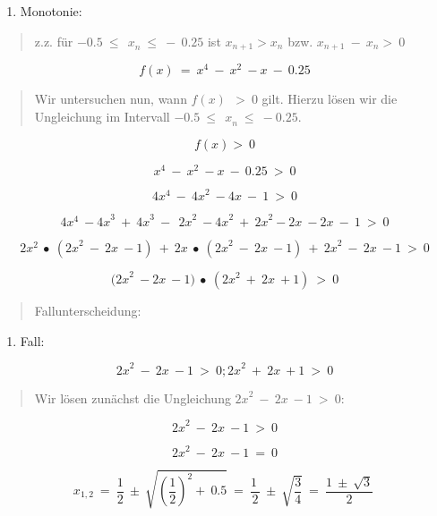 \documentclass[a4paper, 12pt]{book}
\begin{document}
\begin{longtable}[]
\begin{minipage}[b]{\linewidth}
\begin{enumerate}
\def\labelenumi{\arabic{enumi})}
\item
  Monotonie:
\end{enumerate}

\begin{quote}
z.z. für \(- 0.5\ {\leq \ \ x}_{n}\  \leq \  - \ 0.25\) ist
\(x_{n + 1} > x_{n}\) bzw. \(x_{n + 1}\  - {\ x}_{n} > \ 0\)
\end{quote}

\[f(x)\  = \ x^{4}\  - \ x^{2}\  - x\  - \ 0.25\]

\begin{quote}
Wir untersuchen nun, wann \(f(x)\ \  > \ 0\) gilt. Hierzu lösen wir die
Ungleichung im Intervall \(- 0.5\ {\leq \ \ x}_{n}\  \leq \  - 0.25\).
\end{quote}

\[f(x) > \ 0\]

\[x^{4}\  - \ x^{2}\  - x\  - \ 0.25\  > \ 0\]

\[4x^{4}\  - \ {4x}^{2}\  - 4x\  - \ 1\  > \ 0\]

\[4x^{4}\  - {4x}^{3}\  + \ {4x}^{3}\  - \ \ {2x}^{2}\  - {4x}^{2}\  + \ {2x}^{2} - 2x\  - 2x\  - \ 1\  > \ 0\]

\[2x^{2}\  \bullet \ ({2x}^{2}\  - \ 2x\  - 1)\  + \ 2x\  \bullet \ ({2x}^{2}\  - \ 2x\  - 1)\  + \ {2x}^{2}\  - \ 2x\  - 1\  > \ 0\]

\[{(2x}^{2}\  - 2x\  - 1)\  \bullet \ ({2x}^{2}\  + \ 2x\  + 1)\  > \ 0\]

\begin{quote}
Fallunterscheidung:
\end{quote}

\begin{enumerate}
\def\labelenumi{\arabic{enumi}.}
\item
  Fall:
\end{enumerate}

\[{2x}^{2}\  - \ 2x\  - 1\  > \ 0;{2x}^{2}\  + \ 2x\  + 1\  > \ 0\]

\begin{quote}
Wir lösen zunächst die Ungleichung \({2x}^{2}\  - \ 2x\  - 1\  > \ 0\):
\end{quote}

\[{2x}^{2}\  - \ 2x\  - 1\  > \ 0\]

\[{2x}^{2}\  - \ 2x\  - 1\  = \ 0\]

\[x_{1,2}\  = \ \frac{1}{2}\  \pm \ \sqrt{\left( \frac{1}{2} \right)^{2} + \ 0.5}\  = \ \frac{1\ }{2}\  \pm \ \sqrt{\frac{3}{4}}\  = \ \frac{1\  \pm \ \sqrt{3}}{2}\ \]


\end{minipage}
\end{longtable}
\end{document}
